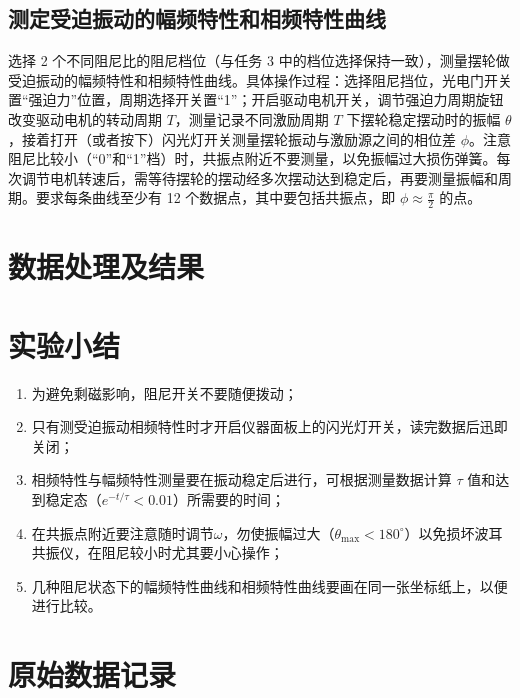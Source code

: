 \documentclass[12pt,a4paper]{amsart}
\begin{document}
\subsection{测定受迫振动的幅频特性和相频特性曲线}

选择 2 个不同阻尼比的阻尼档位（与任务 3 中的档位选择保持一致），测量摆轮做受迫振动的幅频特性和相频特性曲线。具体操作过程：选择阻尼挡位，光电门开关置“强迫力”位置，周期选择开关置“1”；开启驱动电机开关，调节强迫力周期旋钮改变驱动电机的转动周期 $T$，测量记录不同激励周期 $T$ 下摆轮稳定摆动时的振幅 $\theta$，接着打开（或者按下）闪光灯开关测量摆轮振动与激励源之间的相位差 $\phi$。注意阻尼比较小（“0”和“1”档）时，共振点附近不要测量，以免振幅过大损伤弹簧。每次调节电机转速后，需等待摆轮的摆动经多次摆动达到稳定后，再要测量振幅和周期。要求每条曲线至少有 12 个数据点，其中要包括共振点，即 $\phi\approx\frac{\pi}{2}$ 的点。

\section{数据处理及结果}

\section{实验小结}

\begin{enumerate}
	\item 为避免剩磁影响，阻尼开关不要随便拨动；
	\item 只有测受迫振动相频特性时才开启仪器面板上的闪光灯开关，读完数据后迅即关闭；
	\item 相频特性与幅频特性测量要在振动稳定后进行，可根据测量数据计算 $\tau$ 值和达到稳定态（$e^{-t/\tau}<0.01$）所需要的时间；
	\item 在共振点附近要注意随时调节$\omega$，勿使振幅过大（$\theta_{\text{max}}<180^\circ$）以免损坏波耳共振仪，在阻尼较小时尤其要小心操作；
	\item 几种阻尼状态下的幅频特性曲线和相频特性曲线要画在同一张坐标纸上，以便进行比较。
\end{enumerate}

\section{原始数据记录}
\end{document}
